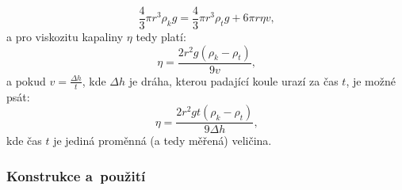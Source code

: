\documentclass[12pt]{article}
\begin{document}
\begin{equation}
    \frac{4}{3}\pi r^3 \rho_k g = \frac{4}{3}\pi r^3 \rho_t g + 6\pi r\eta v\text{,}
\end{equation}
a pro viskozitu kapaliny $\eta$ tedy platí:~\cite{book:Calibration_of_viscometers}
\begin{equation}
    \eta = \frac{2r^2g(\rho_k-\rho_t)}{9v}\text{,}
\end{equation}
a pokud $v = \frac{\Delta h}{t}$, kde $\Delta h$ je dráha, kterou padající koule urazí za čas $t$, je možné psát:
\begin{equation}
    \eta = \frac{2r^2gt(\rho_k-\rho_t)}{9\Delta h}\text{,}
    \label{eq:kulickovy_viskozimetr}
\end{equation}
kde čas $t$ je jediná proměnná (a tedy měřená) veličina.

\subsubsection{Konstrukce a~použití}%
\end{document}
